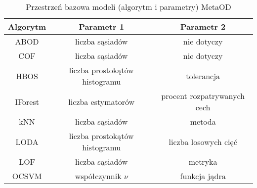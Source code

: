 \begin{table}[]
    \centering
    \begin{tabular}{c|c|c}
    Algorytm & Parametr 1 & Parametr 2 \\ \hline
    ABOD     & liczba sąsiadów & nie dotyczy \\
    COF & liczba sąsiadów & nie dotyczy \\
    HBOS & liczba prostokątów histogramu & tolerancja \\
    IForest & liczba estymatorów & procent rozpatrywanych cech \\
    kNN & liczba sąsiadów & metoda \\
    LODA & liczba prostokątów histogramu & liczba losowych cięć \\
    LOF & liczba sąsiadów & metryka \\
    OCSVM &współczynnik $\nu$ & funkcja jądra
    \end{tabular}
    \caption{Przestrzeń bazowa modeli (algorytm i parametry) MetaOD \cite{zhao2020metaod}}
    \label{tab:my_label}
\end{table}